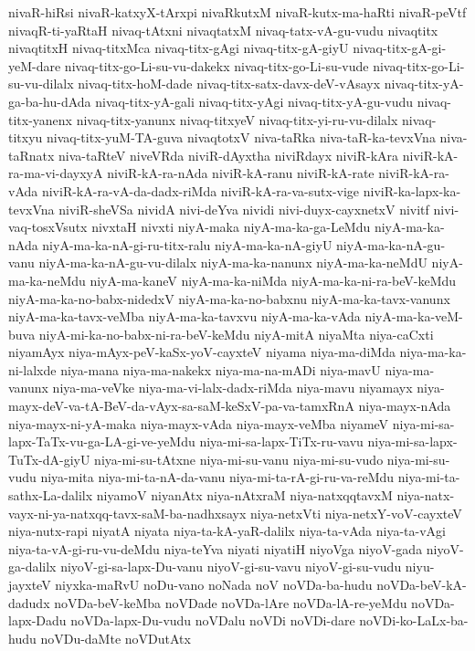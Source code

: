 {nivaR-hiRsi
nivaR-katxyX-tArxpi
nivaRkutxM
nivaR-kutx-ma-haRti
nivaR-peVtf
nivaqR-ti-yaRtaH
nivaq-tAtxni
nivaqtatxM
nivaq-tatx-vA-gu-vudu
nivaqtitx
nivaqtitxH
nivaq-titxMca
nivaq-titx-gAgi
nivaq-titx-gA-giyU
nivaq-titx-gA-gi-yeM-dare
nivaq-titx-go-Li-su-vu-dakekx
nivaq-titx-go-Li-su-vude
nivaq-titx-go-Li-su-vu-dilalx
nivaq-titx-hoM-dade
nivaq-titx-satx-davx-deV-vAsayx
nivaq-titx-yA-ga-ba-hu-dAda
nivaq-titx-yA-gali
nivaq-titx-yAgi
nivaq-titx-yA-gu-vudu
nivaq-titx-yanenx
nivaq-titx-yanunx
nivaq-titxyeV
nivaq-titx-yi-ru-vu-dilalx
nivaq-titxyu
nivaq-titx-yuM-TA-guva
nivaqtotxV
niva-taRka
niva-taR-ka-tevxVna
niva-taRnatx
niva-taRteV
niveVRda
niviR-dAyxtha
niviRdayx
niviR-kAra
niviR-kA-ra-ma-vi-dayxyA
niviR-kA-ra-nAda
niviR-kA-ranu
niviR-kA-rate
niviR-kA-ra-vAda
niviR-kA-ra-vA-da-dadx-riMda
niviR-kA-ra-va-sutx-vige
niviR-ka-lapx-ka-tevxVna
niviR-sheVSa
nividA
nivi-deYva
nividi
nivi-duyx-cayxnetxV
nivitf
nivi-vaq-tosxVsutx
nivxtaH
nivxti
niyA-maka
niyA-ma-ka-ga-LeMdu
niyA-ma-ka-nAda
niyA-ma-ka-nA-gi-ru-titx-ralu
niyA-ma-ka-nA-giyU
niyA-ma-ka-nA-gu-vanu
niyA-ma-ka-nA-gu-vu-dilalx
niyA-ma-ka-nanunx
niyA-ma-ka-neMdU
niyA-ma-ka-neMdu
niyA-ma-kaneV
niyA-ma-ka-niMda
niyA-ma-ka-ni-ra-beV-keMdu
niyA-ma-ka-no-babx-nidedxV
niyA-ma-ka-no-babxnu
niyA-ma-ka-tavx-vanunx
niyA-ma-ka-tavx-veMba
niyA-ma-ka-tavxvu
niyA-ma-ka-vAda
niyA-ma-ka-veM-buva
niyA-mi-ka-no-babx-ni-ra-beV-keMdu
niyA-mitA
niyaMta
niya-caCxti
niyamAyx
niya-mAyx-peV-kaSx-yoV-cayxteV
niyama
niya-ma-diMda
niya-ma-ka-ni-lalxde
niya-mana
niya-ma-nakekx
niya-ma-na-mADi
niya-mavU
niya-ma-vanunx
niya-ma-veVke
niya-ma-vi-lalx-dadx-riMda
niya-mavu
niyamayx
niya-mayx-deV-va-tA-BeV-da-vAyx-sa-saM-keSxV-pa-va-tamxRnA
niya-mayx-nAda
niya-mayx-ni-yA-maka
niya-mayx-vAda
niya-mayx-veMba
niyameV
niya-mi-sa-lapx-TaTx-vu-ga-LA-gi-ve-yeMdu
niya-mi-sa-lapx-TiTx-ru-vavu
niya-mi-sa-lapx-TuTx-dA-giyU
niya-mi-su-tAtxne
niya-mi-su-vanu
niya-mi-su-vudo
niya-mi-su-vudu
niya-mita
niya-mi-ta-nA-da-vanu
niya-mi-ta-rA-gi-ru-va-reMdu
niya-mi-ta-sathx-La-dalilx
niyamoV
niyanAtx
niya-nAtxraM
niya-natxqqtavxM
niya-natx-vayx-ni-ya-natxqq-tavx-saM-ba-nadhxsayx
niya-netxVti
niya-netxY-voV-cayxteV
niya-nutx-rapi
niyatA
niyata
niya-ta-kA-yaR-dalilx
niya-ta-vAda
niya-ta-vAgi
niya-ta-vA-gi-ru-vu-deMdu
niya-teYva
niyati
niyatiH
niyoVga
niyoV-gada
niyoV-ga-dalilx
niyoV-gi-sa-lapx-Du-vanu
niyoV-gi-su-vavu
niyoV-gi-su-vudu
niyu-jayxteV
niyxka-maRvU
noDu-vano
noNada
noV
noVDa-ba-hudu
noVDa-beV-kA-dadudx
noVDa-beV-keMba
noVDade
noVDa-lAre
noVDa-lA-re-yeMdu
noVDa-lapx-Dadu
noVDa-lapx-Du-vudu
noVDalu
noVDi
noVDi-dare
noVDi-ko-LaLx-ba-hudu
noVDu-daMte
noVDutAtx
}
